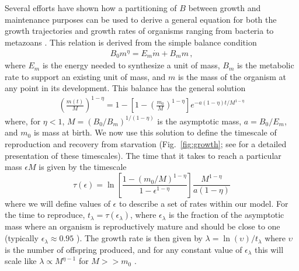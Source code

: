 \documentclass[11pt]{article}
\begin{document}
\begin{multicols}{2}
Several efforts have shown how a partitioning of $B$ between growth and
maintenance purposes can be used to derive a general equation for both the
growth trajectories and growth rates of organisms ranging from bacteria to
metazoans
\cite{West:2001bv,moses2008rmo,gillooly2002esa,hou,Kempes:2012hy}. This relation is derived from the simple balance condition \cite{West:2001bv,moses2008rmo,gillooly2002esa,hou,Kempes:2012hy}
\begin{eqnarray}
\label{balance}
B_{0}m^{\eta}=E_{m}\dot{m}+B_{m}m\,,
\end{eqnarray}
where $E_{m}$ is the energy needed to synthesize a unit of mass, $B_{m}$ is
the metabolic rate to support an existing unit of mass, and $m$ is the mass
of the organism at any point in its development.  This balance has the
general solution \cite{bettencourt,Kempes:2012hy}
\begin{eqnarray}
\label{m1}
\left(\frac{m\left(t\right)}{M}\right)^{1-\eta}\!=1\!-\!\left[1\!-\!\left(\frac{m_{0}}{M}\right)^{1\!-\!\eta}\right]e^{-a\left(1\!-\!\eta\right)t/M^{1-\eta}}
\end{eqnarray}
where, for $\eta<1$, $M=(B_{0}/B_{m})^{1/(1-\eta)}$ is the asymptotic mass, $a=B_{0}/E_{m}$, and $m_0$ is mass at birth.  We now use this solution to define the timescale of reproduction and recovery from starvation (Fig.~\ref{fig:growth}; see \cite{moses2008rmo} for a detailed presentation of these timescales). The time that it takes to reach a particular mass $\epsilon M$ is given by the timescale 
\begin{equation}
\label{t1}
\tau\left(\epsilon\right) = \ln\left[\frac{1-\left(m_{0}/M\right)^{1-\eta}}{1-\epsilon^{1-\eta}}\right]\frac{M^{1-\eta}}{a\left(1-\eta\right)}
\end{equation}
where we will define values of $\epsilon$ to describe a set of rates within our model. For the time to reproduce, $t_{\lambda}=\tau\left(\epsilon_{\lambda}\right)$, where $\epsilon_{\lambda}$ is the fraction of the asymptotic mass where an organism is reproductively mature and should be close to one (typically $\epsilon_{\lambda}\approx0.95$ \cite{West:2001bv}). The growth rate is then given by $\lambda=\ln\left(\upsilon\right)/t_{\lambda}$ where $\upsilon$ is the number of offspring produced, and for any constant value of $\epsilon_{\lambda}$ this will scale like $\lambda\propto M^{\eta-1}$ for $M>>m_{0}$ \cite{West:2001bv,moses2008rmo,gillooly2002esa,hou,Kempes:2012hy}.



\end{multicols}
\end{document}
